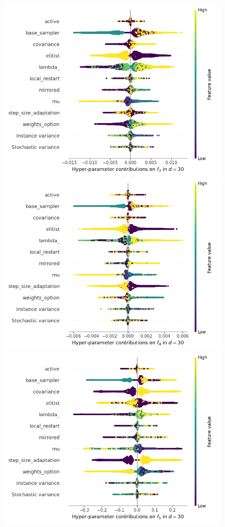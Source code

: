 \begin{figure}[t]
	\includegraphics[height=0.15\textheight,trim=60mm 0mm 30mm 0mm,clip]{cma_img_new/img_summary_f3_d30.png}
	\includegraphics[height=0.15\textheight,trim=60mm 0mm 0mm 0mm,clip]{cma_img_new/img_summary_f4_d30.png}
	\includegraphics[height=0.15\textheight,trim=0mm 0mm 30mm 0mm,clip]{cma_img_new/img_summary_f5_d30.png}

\end{figure}
